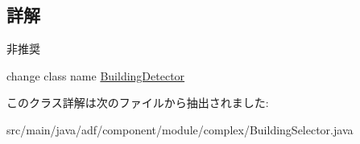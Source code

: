 \subsection{詳解}
\begin{DoxyRefDesc}{非推奨}
\item[\hyperlink{deprecated__deprecated000013}{非推奨}]change class name \hyperlink{classadf_1_1component_1_1module_1_1complex_1_1BuildingDetector}{Building\+Detector} \end{DoxyRefDesc}


このクラス詳解は次のファイルから抽出されました\+:\begin{DoxyCompactItemize}
\item 
src/main/java/adf/component/module/complex/Building\+Selector.\+java\end{DoxyCompactItemize}
